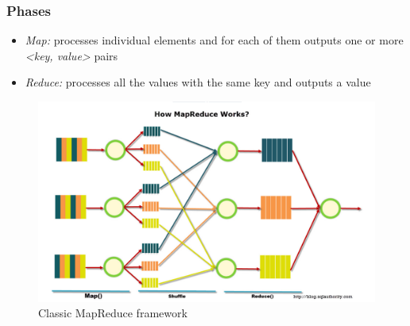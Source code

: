 \subsubsection{Phases}
\begin{itemize}
    \item \textit{Map:} processes individual elements and for each of them outputs one or more \textit{<key, value>} pairs
    \item \textit{Reduce:} processes all the values with the same key and outputs a value
\end{itemize}

\begin{figure}[h]
    \caption{Classic MapReduce framework}
    \includegraphics[width=\textwidth]{src/images/big-data/map-reduce.png}
    \centering
\end{figure}

